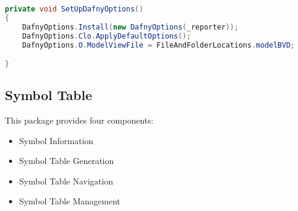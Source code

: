 


\begin{lstlisting}[language=csharp, caption={Setting up Dafny Options}, captionpos=b, label={lst:setupdafnyoptions}]
private void SetUpDafnyOptions()
{
    DafnyOptions.Install(new DafnyOptions(_reporter));
    DafnyOptions.Clo.ApplyDefaultOptions();
    DafnyOptions.O.ModelViewFile = FileAndFolderLocations.modelBVD;

}
\end{lstlisting}


\subsection{Symbol Table}
This package provides four components:
\\
\begin{itemize}
    \item Symbol Information
    \item Symbol Table Generation
    \item Symbol Table Navigation
    \item Symbol Table Management
\end{itemize}

